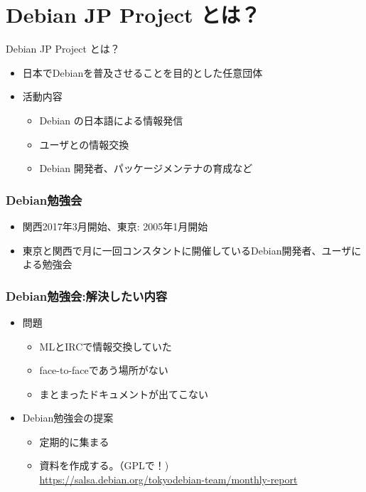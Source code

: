 \documentclass[cjk,dvipdfmx,10pt,compress,%
hyperref={bookmarks=true,bookmarksnumbered=true,bookmarksopen=false,%
colorlinks=false,%
pdftitle={第 132 回 関西 Debian 勉強会},%
pdfauthor={かわだ},%
pdfsubject={資料},%
}]{beamer}
\begin{document}
\section{Debian JP Project とは？}
\begin{frame}{Debian JP Project とは？}
\begin{itemize}
  \item 日本でDebianを普及させることを目的とした任意団体
  \item 活動内容
  \begin{itemize}
    \item Debian の日本語による情報発信
    \item ユーザとの情報交換
    \item Debian 開発者、パッケージメンテナの育成など
  \end{itemize}
\end{itemize}
\end{frame}

\begin{frame}
\frametitle{Debian勉強会}
\begin{itemize}
 \item 関西2017年3月開始、東京: 2005年1月開始
 \item 東京と関西で月に一回コンスタントに開催しているDebian開発者、ユーザによる勉強会
\end{itemize}
\end{frame}

\begin{frame}
\frametitle{Debian勉強会:解決したい内容}
\begin{itemize}
 \item<1-> 問題
       \begin{itemize}
	\item MLとIRCで情報交換していた
	\item face-to-faceであう場所がない
	\item まとまったドキュメントが出てこない
       \end{itemize}
 \item<2-> Debian勉強会の提案
       \begin{itemize}
	\item 定期的に集まる
	\item 資料を作成する。（GPLで！) \\
	  {\small \url{https://salsa.debian.org/tokyodebian-team/monthly-report}}
       \end{itemize}
\end{itemize}
\end{frame}
\end{document}

